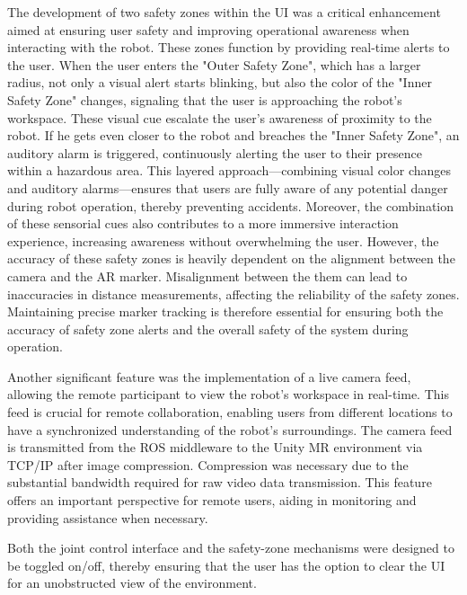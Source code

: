 The development of two safety zones within the \ac{UI} was a critical enhancement aimed at ensuring user safety and improving operational awareness when interacting with the robot. These zones function by providing real-time alerts to the user. When the user enters the "Outer Safety Zone", which has a larger radius, not only a visual alert starts blinking, but also the color of the "Inner Safety Zone" changes, signaling that the user is approaching the robot's workspace. These visual cue escalate the user's awareness of proximity to the robot. If he gets even closer to the robot and breaches the "Inner Safety Zone", an auditory alarm is triggered, continuously alerting the user to their presence within a hazardous area. This layered approach—combining visual color changes and auditory alarms—ensures that users are fully aware of any potential danger during robot operation, thereby preventing accidents. Moreover, the combination of these sensorial cues also contributes to a more immersive interaction experience, increasing awareness without overwhelming the user.
However, the accuracy of these safety zones is heavily dependent on the alignment between the camera and the \ac{AR} marker. Misalignment between the them can lead to inaccuracies in distance measurements, affecting the reliability of the safety zones. Maintaining precise marker tracking is therefore essential for ensuring both the accuracy of safety zone alerts and the overall safety of the system during operation.

Another significant feature was the implementation of a live camera feed, allowing the remote participant to view the robot’s workspace in real-time. This feed is crucial for remote collaboration, enabling users from different locations to have a synchronized understanding of the robot’s surroundings. The camera feed is transmitted from the \ac{ROS} middleware to the Unity \ac{MR} environment via \ac{TCP}/\ac{IP} after image compression. Compression was necessary due to the substantial bandwidth required for raw video data transmission. This feature offers an important perspective for remote users, aiding in monitoring and providing assistance when necessary.

Both the joint control interface and the safety-zone mechanisms were designed to be toggled on/off, thereby ensuring that the user has the option to clear the \ac{UI} for an unobstructed view of the environment.

